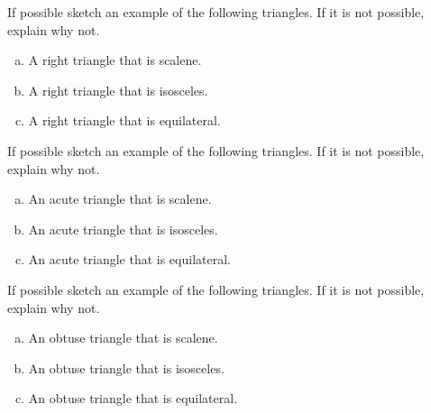 \begin{problem}
If possible sketch an example of the following triangles.  If it is not possible, explain why not.

\begin{enumerate}[(a)]
\item
A right triangle that is scalene.\\

\item
A right triangle that is isosceles.\\

\item
A right triangle that is equilateral.
\end{enumerate}
\end{problem}



\bigskip


\begin{problem}
If possible sketch an example of the following triangles.  If it is not possible, explain why not.

\begin{enumerate}[(a)]
\item
An acute triangle that is scalene.\\

\item
An acute triangle that is isosceles.\\

\item
An acute triangle that is equilateral.
\end{enumerate}
\end{problem}


\bigskip


\begin{problem}
If possible sketch an example of the following triangles.  If it is not possible, explain why not.

\begin{enumerate}[(a)]
\item
An obtuse triangle that is scalene.\\

\item
An obtuse triangle that is isosceles.\\

\item
An obtuse triangle that is equilateral.
\end{enumerate}
\end{problem}


